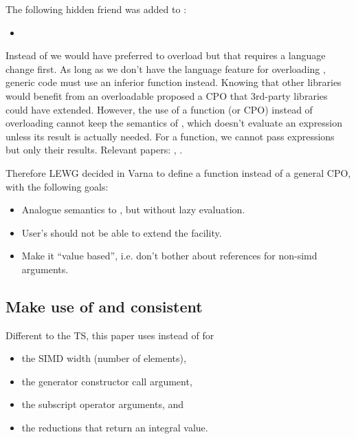 The following hidden friend was added to \simd:
\begin{itemize}
    \raggedright
  \item {}
\end{itemize}

Instead of \code{\simdselect} we would have preferred to overload
 but that requires a language change first.
As long as we don't have the language feature for overloading ,
generic code must use an inferior function instead.
Knowing that other libraries would benefit from an overloadable
  proposed a 
CPO that 3rd-party libraries could have extended.
However, the use of a function (or CPO) instead of overloading
 cannot keep the semantics of , which doesn't
evaluate an expression unless its result is actually needed.
For a function, we cannot pass expressions but only their results.
Relevant papers: \cite{P0927R2}, \cite{D0917}.

Therefore LEWG decided in Varna to define a \std{} function
instead of a general CPO, with the following goals:
\begin{itemize}
  \item Analogue semantics to , but without lazy evaluation.
  \item User's should not be able to extend the facility.
  \item Make it “value based”, i.e. don't bother about references for non-simd
    arguments.
\end{itemize}

\subsection{Make use of  and  consistent}\label{sec:simdsizetype}

Different to the TS, this paper uses \code{\simdsizetype} instead of  for
\begin{itemize}
  \item the SIMD width (number of elements),
  \item the generator constructor call argument,
  \item the subscript operator arguments, and
  \item the \mask reductions that return an integral value.
\end{itemize}

